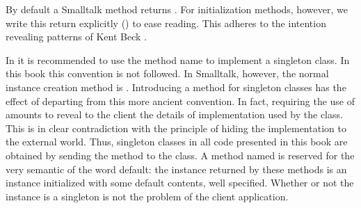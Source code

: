 By default a Smalltalk method returns . For
initialization methods, however, we write this return explicitly
() to ease reading. This adheres to the intention
revealing patterns of Kent Beck \cite{Beck}.

In \cite{StDesPat} it is recommended to use the method name  to implement a singleton class. In this book this
convention is not followed. In Smalltalk, however, the normal
instance creation method is . Introducing a method  for singleton classes has the effect of departing from
this more ancient convention. In fact, requiring the use of  amounts to reveal to the client the details of
implementation used by the class. This is in clear contradiction
with the principle of hiding the implementation to the external
world.
Thus, singleton classes in all code presented in this book
are obtained by sending the method  to the class.
A method named  is reserved for the very semantic of
the word default: the instance returned by these methods is an
instance initialized with some default contents, well specified.
Whether or not the instance is a singleton is not the problem of
the client application.

